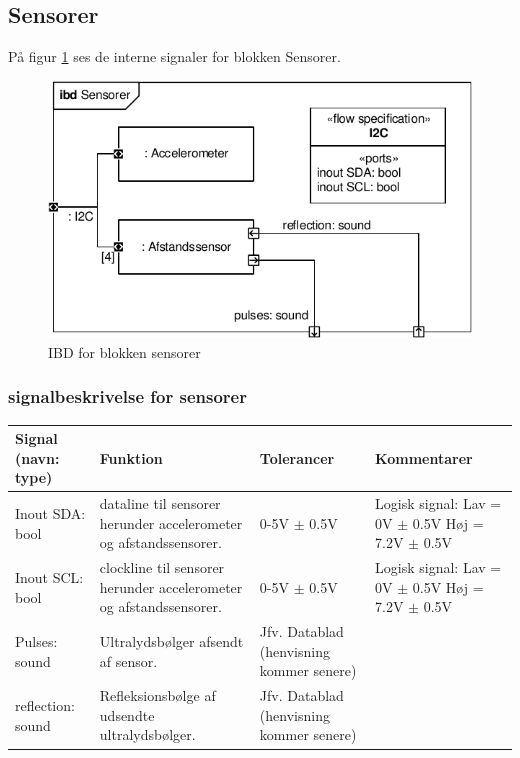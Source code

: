 \subsection{Sensorer}

På figur \ref{fig:ibd_sensorer} ses de interne signaler for blokken Sensorer.

\begin{figure}[h]
\centering
\includegraphics[scale=1]{../fig/diagrammer/bil/ibd_sensorer.pdf}
\caption{IBD for blokken sensorer}
\label{fig:ibd_sensorer}
\end{figure}

\subsubsection{signalbeskrivelse for sensorer}

\begin{table}[h]
	\centering
	\begin{tabularx}{\textwidth}{|l|X|X|X|} \hline
	\textbf{Signal (navn: type)} & \textbf{Funktion} & \textbf{Tolerancer} & \textbf{Kommentarer} \\ \hline
Inout SDA: bool
	& \IIC dataline til sensorer herunder accelerometer og afstandssensorer. 
	& 0-5V $\pm$ 0.5V
 	& Logisk signal: \newline
		Lav = 0V $\pm$ 0.5V \newline
		Høj = 7.2V $\pm$ 0.5V
	\\ \hline

Inout SCL: bool
	& \IIC clockline  til sensorer herunder accelerometer og afstandssensorer. 
	& 0-5V $\pm$ 0.5V
 	& Logisk signal: \newline
		Lav = 0V $\pm$ 0.5V \newline
		Høj = 7.2V $\pm$ 0.5V
	\\ \hline

Pulses: sound
	& Ultralydsbølger afsendt af sensor. 
	& Jfv. Datablad (henvisning kommer senere) %
 	& ~
	\\ \hline
	
reflection: sound
	& Refleksionsbølge af udsendte ultralydsbølger. 
	& Jfv. Datablad (henvisning kommer senere) %
 	& ~
	\\ \hline
	\end{tabularx}
\end{table}